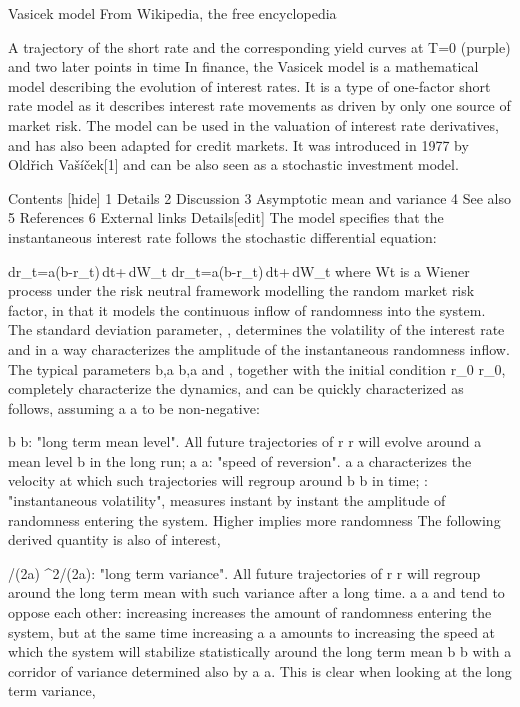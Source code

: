 Vasicek model
From Wikipedia, the free encyclopedia

A trajectory of the short rate and the corresponding yield curves at T=0 (purple) and two later points in time
In finance, the Vasicek model is a mathematical model describing the evolution of interest rates. It is a type of one-factor short rate model as it describes interest rate movements as driven by only one source of market risk. The model can be used in the valuation of interest rate derivatives, and has also been adapted for credit markets. It was introduced in 1977 by Oldřich Vašíček[1] and can be also seen as a stochastic investment model.

Contents  [hide] 
1	Details
2	Discussion
3	Asymptotic mean and variance
4	See also
5	References
6	External links
Details[edit]
The model specifies that the instantaneous interest rate follows the stochastic differential equation:

{\displaystyle dr_{t}=a(b-r_{t})\,dt+\sigma \,dW_{t}} dr_{t}=a(b-r_{t})\,dt+\sigma \,dW_{t}
where Wt is a Wiener process under the risk neutral framework modelling the random market risk factor, in that it models the continuous inflow of randomness into the system. The standard deviation parameter, {\displaystyle \sigma } \sigma , determines the volatility of the interest rate and in a way characterizes the amplitude of the instantaneous randomness inflow. The typical parameters {\displaystyle b,a} b,a and {\displaystyle \sigma } \sigma , together with the initial condition {\displaystyle r_{0}} r_{0}, completely characterize the dynamics, and can be quickly characterized as follows, assuming {\displaystyle a} a to be non-negative:

{\displaystyle b} b: "long term mean level". All future trajectories of {\displaystyle r} r will evolve around a mean level b in the long run;
{\displaystyle a} a: "speed of reversion". {\displaystyle a} a characterizes the velocity at which such trajectories will regroup around {\displaystyle b} b in time;
{\displaystyle \sigma } \sigma : "instantaneous volatility", measures instant by instant the amplitude of randomness entering the system. Higher {\displaystyle \sigma } \sigma  implies more randomness
The following derived quantity is also of interest,

{/(2a)} {\sigma ^{2}}/(2a): "long term variance". All future trajectories of {\displaystyle r} r will regroup around the long term mean with such variance after a long time.
{\displaystyle a} a and {\displaystyle \sigma } \sigma  tend to oppose each other: increasing {\displaystyle \sigma } \sigma  increases the amount of randomness entering the system, but at the same time increasing {\displaystyle a} a amounts to increasing the speed at which the system will stabilize statistically around the long term mean {\displaystyle b} b with a corridor of variance determined also by {\displaystyle a} a. This is clear when looking at the long term variance,

